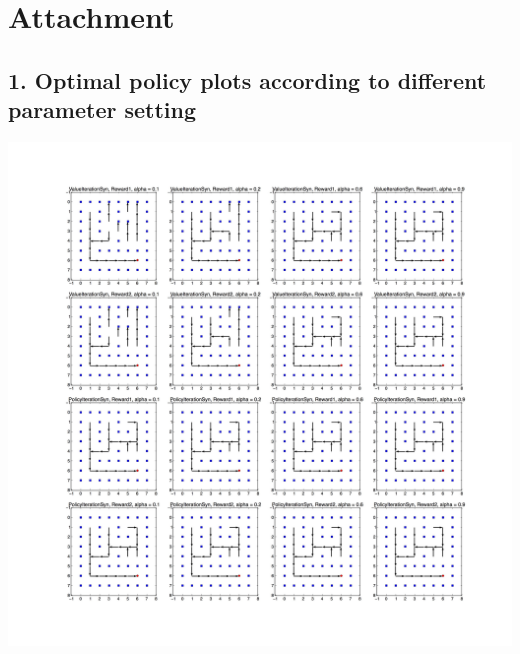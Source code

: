 \documentclass[12pt,a4paper,titlepage]{article}
\begin{document}
\section*{Attachment}
\subsection*{1. Optimal policy plots according to different parameter setting}
\begin{center}
\includegraphics[scale=0.11]{PolicyPlot.jpg}
\end{center}
\newpage
\end{document}
